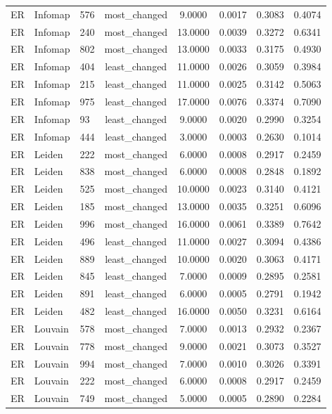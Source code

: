 \begin{longtable}{lllccccc}
ER & Infomap & 576 & most\_changed & 9.0000 & 0.0017 & 0.3083 & 0.4074 \\
ER & Infomap & 240 & most\_changed & 13.0000 & 0.0039 & 0.3272 & 0.6341 \\
ER & Infomap & 802 & most\_changed & 13.0000 & 0.0033 & 0.3175 & 0.4930 \\
ER & Infomap & 404 & least\_changed & 11.0000 & 0.0026 & 0.3059 & 0.3984 \\
ER & Infomap & 215 & least\_changed & 11.0000 & 0.0025 & 0.3142 & 0.5063 \\
ER & Infomap & 975 & least\_changed & 17.0000 & 0.0076 & 0.3374 & 0.7090 \\
ER & Infomap & 93 & least\_changed & 9.0000 & 0.0020 & 0.2990 & 0.3254 \\
ER & Infomap & 444 & least\_changed & 3.0000 & 0.0003 & 0.2630 & 0.1014 \\
ER & Leiden & 222 & most\_changed & 6.0000 & 0.0008 & 0.2917 & 0.2459 \\
ER & Leiden & 838 & most\_changed & 6.0000 & 0.0008 & 0.2848 & 0.1892 \\
ER & Leiden & 525 & most\_changed & 10.0000 & 0.0023 & 0.3140 & 0.4121 \\
ER & Leiden & 185 & most\_changed & 13.0000 & 0.0035 & 0.3251 & 0.6096 \\
ER & Leiden & 996 & most\_changed & 16.0000 & 0.0061 & 0.3389 & 0.7642 \\
ER & Leiden & 496 & least\_changed & 11.0000 & 0.0027 & 0.3094 & 0.4386 \\
ER & Leiden & 889 & least\_changed & 10.0000 & 0.0020 & 0.3063 & 0.4171 \\
ER & Leiden & 845 & least\_changed & 7.0000 & 0.0009 & 0.2895 & 0.2581 \\
ER & Leiden & 891 & least\_changed & 6.0000 & 0.0005 & 0.2791 & 0.1942 \\
ER & Leiden & 482 & least\_changed & 16.0000 & 0.0050 & 0.3231 & 0.6164 \\
ER & Louvain & 578 & most\_changed & 7.0000 & 0.0013 & 0.2932 & 0.2367 \\
ER & Louvain & 778 & most\_changed & 9.0000 & 0.0021 & 0.3073 & 0.3527 \\
ER & Louvain & 994 & most\_changed & 7.0000 & 0.0010 & 0.3026 & 0.3391 \\
ER & Louvain & 222 & most\_changed & 6.0000 & 0.0008 & 0.2917 & 0.2459 \\
ER & Louvain & 749 & most\_changed & 5.0000 & 0.0005 & 0.2890 & 0.2284 \\

\end{longtable}
